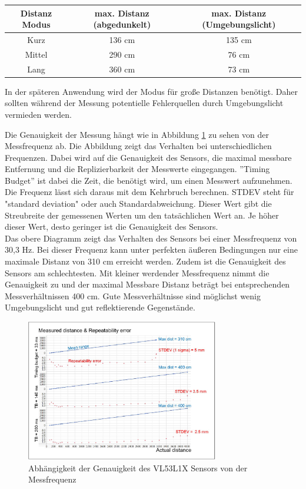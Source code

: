 \begin{center}
	\begin{tabular} [H] {|c|c|c|}
		\hline
		\textbf{Distanz Modus} & \textbf{max. Distanz (abgedunkelt)}	& \textbf{max. Distanz (Umgebungslicht)} 	 \\ \hline
		Kurz	&  136 cm		& 135 cm\\ \hline
		Mittel  &  290 cm	  	& 76 cm	\\ \hline
		Lang 	&  360 cm		& 73 cm	\\ \hline
				
		\end {tabular}
		\label{distanzmodi}
	\end{center}

In der späteren Anwendung wird der Modus für große Distanzen benötigt. Daher sollten während der Messung potentielle Fehlerquellen durch Umgebungslicht vermieden werden.

Die Genauigkeit der Messung hängt wie in Abbildung \ref{VL53L1X} zu sehen von der Messfrequenz ab. Die Abbildung zeigt das Verhalten bei unterschiedlichen Frequenzen. Dabei wird auf die Genauigkeit des Sensors, die maximal messbare Entfernung und die Replizierbarkeit der Messwerte eingegangen. ''Timing Budget'' ist dabei die Zeit, die benötigt wird, um einen Messwert aufzunehmen. Die Frequenz lässt sich daraus mit dem Kehrbruch berechnen.
STDEV steht für "standard deviation" oder auch Standardabweichung. Dieser Wert gibt die Streubreite der gemessenen Werten um den tatsächlichen Wert an. Je höher dieser Wert, desto geringer ist die Genauigkeit des Sensors. \\ 
 
Das obere Diagramm zeigt das Verhalten des Sensors bei einer Messfrequenz von 30,3 Hz. Bei dieser Frequenz kann unter perfekten äußeren Bedingungen nur eine maximale Distanz von 310 cm erreicht werden. Zudem ist die Genauigkeit des Sensors am schlechtesten. Mit kleiner werdender Messfrequenz nimmt die Genauigkeit zu und der maximal Messbare Distanz beträgt bei entsprechenden Messverhältnissen 400 cm. Gute Messverhältnisse sind möglichst wenig Umgebungslicht und gut reflektierende Gegenstände. \cite{VL53L1X_manual}

\begin{figure}[H]
	\centering
	\includegraphics[width=0.75\textwidth]{images/Hardware/VL53L1X_Messfrequenz}
	\caption{Abhängigkeit der Genauigkeit des VL53L1X Sensors von der Messfrequenz}
	\label{VL53L1X}
\end{figure}


